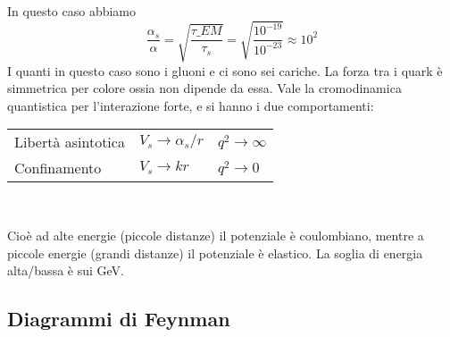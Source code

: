 \begin{itemize}
\begin{enumerate}
    In questo caso abbiamo 
    \begin{equation*}
    \frac{\alpha_s}\alpha=\sqrt{\frac{\tau\_{EM}}{\tau_s}}=\sqrt{\frac{10^{-19}}{10^{-23}}}\approx10^2
    \end{equation*}
    I quanti in questo caso sono i gluoni e ci sono sei cariche. La forza tra i quark è simmetrica per colore ossia non dipende da essa. Vale la cromodinamica quantistica per l'interazione forte, e si hanno i due comportamenti: 
    \\
    \begin{center}
    \begin{tabular}{>{\centering\arraybackslash}m{3cm} >{\centering\arraybackslash}m{3cm} >{\centering\arraybackslash}m{3cm}}
        Libertà asintotica & $V_s\to\alpha_s/r$ & $q^2\to\infty$\\
        Confinamento & $V_s\to kr$ & $q^2\to0$\\
    \end{tabular}\\
    \end{center}
    Cioè ad alte energie (piccole distanze) il potenziale è coulombiano, mentre a piccole energie (grandi distanze) il potenziale è elastico. La soglia di energia alta/bassa è sui GeV.
\end{enumerate}
\end{itemize}
\subsection{Diagrammi di Feynman}
